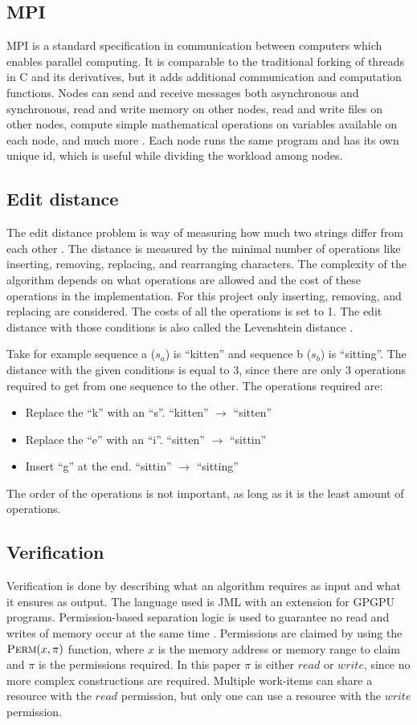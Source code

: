 \subsection{MPI}
MPI is a standard specification in communication between computers which enables parallel computing.
It is comparable to the traditional forking of threads in C and its derivatives, but it adds additional communication and computation functions.
Nodes can send and receive messages both asynchronous and synchronous, read and write memory on other nodes, read and write files on other nodes, compute simple mathematical operations on variables available on each node, and much more \cite{MPI}.
Each node runs the same program and has its own unique id, which is useful while dividing the workload among nodes.

\subsection{Edit distance}
The edit distance problem is way of measuring how much two strings differ from each other \cite{Navarro:2001:GTA:375360.375365}.
The distance is measured by the minimal number of operations like inserting, removing, replacing, and rearranging characters.
The complexity of the algorithm depends on what operations are allowed and the cost of these operations in the implementation.
For this project only inserting, removing, and replacing are considered.
The costs of all the operations is set to 1.
The edit distance with those conditions is also called the Levenshtein distance \cite{Navarro:2001:GTA:375360.375365}.

Take for example sequence a ($s_a$) is ``kitten'' and sequence b ($s_b$) is ``sitting''.
The distance with the given conditions is equal to 3, since there are only 3 operations required to get from one sequence to the other.
The operations required are:
\begin{itemize}
    \item Replace the ``k'' with an ``s''. ``kitten'' $\rightarrow$ ``sitten''
    \item Replace the ``e'' with an ``i''. ``sitten'' $\rightarrow$ ``sittin''
    \item Insert ``g'' at the end. ``sittin'' $\rightarrow$ ``sitting''
\end{itemize}
The order of the operations is not important, as long as it is the least amount of operations.

\subsection{Verification}
Verification is done by describing what an algorithm requires as input and what it ensures as output.
The language used is JML with an extension for GPGPU programs.
Permission-based separation logic is used to guarantee no read and writes of memory occur at the same time \cite{vercors}.
Permissions are claimed by using the $\textproc{Perm}(x, \pi)$ function, where $x$ is the memory address or memory range to claim and $\pi$ is the permissions required.
In this paper $\pi$ is either $read$ or $write$, since no more complex constructions are required.
Multiple work-items can share a resource with the $read$ permission, but only one can use a resource with the $write$ permission.
